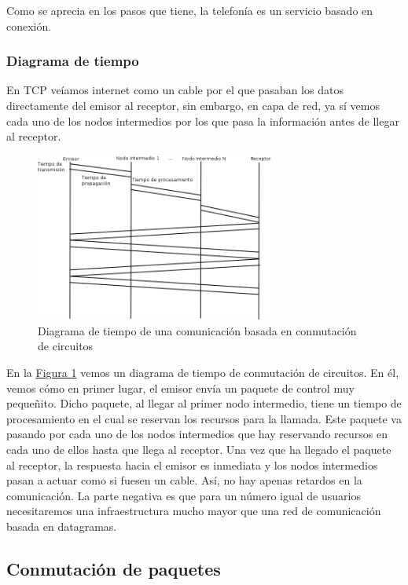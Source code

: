 \documentclass[10pt,a4paper,spanish]{report}
\begin{document}
Como se aprecia en los pasos que tiene, la telefonía es un servicio basado en conexión.

\subsubsection{\textcolor{tema4}Diagrama de tiempo}
En TCP veíamos internet como un cable por el que pasaban los datos directamente del emisor al receptor, sin embargo, en capa de red, ya sí vemos cada uno de los nodos intermedios por los que pasa la información antes de llegar al receptor. 
\begin{figure}[!h]
  \centering
  \includegraphics[width=0.7\textwidth]{concir}
  \caption{Diagrama de tiempo de una comunicación basada en conmutación de circuitos}
  \label{concir}
\end{figure}

En la \hyperref[concir]{Figura \ref*{concir}} vemos un diagrama de tiempo de conmutación de circuitos. En él, vemos cómo en primer lugar, el emisor envía un paquete de control muy pequeñito. Dicho paquete, al llegar al primer nodo intermedio, tiene un tiempo de procesamiento en el cual se reservan los recursos para la llamada. Este paquete va pasando por cada uno de los nodos intermedios que hay reservando recursos en cada uno de ellos hasta que llega al receptor. Una vez que ha llegado el paquete al receptor, la respuesta hacia el emisor es inmediata y los nodos intermedios pasan a actuar como si fuesen un cable. Así, no hay apenas retardos en la comunicación. La parte negativa es que para un número igual de usuarios necesitaremos una infraestructura mucho mayor que una red de comunicación basada en datagramas.


\subsection{\textcolor{tema4}Conmutación de paquetes}
\end{document}
